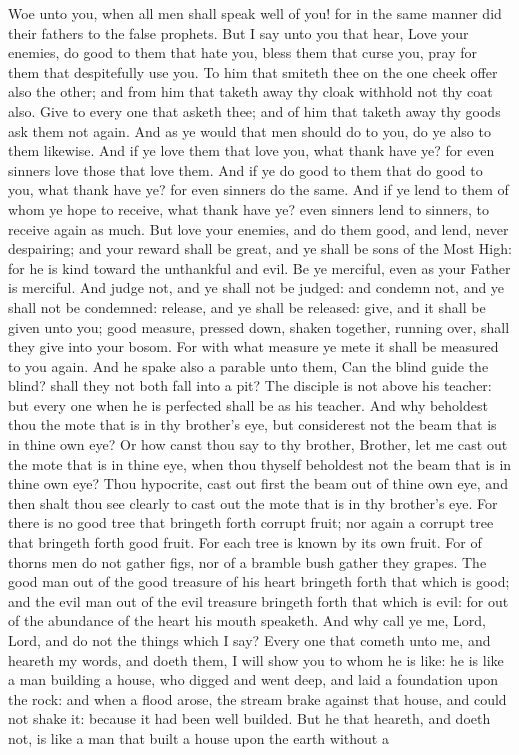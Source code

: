 Woe unto you, when all men shall speak well of you! for in the same manner did their fathers to the false prophets.  But I say unto you that hear, Love your enemies, do good to them that hate you, bless them that curse you, pray for them that despitefully use you. To him that smiteth thee on the one cheek offer also the other; and from him that taketh away thy cloak withhold not thy coat also. Give to every one that asketh thee; and of him that taketh away thy goods ask them not again. And as ye would that men should do to you, do ye also to them likewise. And if ye love them that love you, what thank have ye? for even sinners love those that love them. And if ye do good to them that do good to you, what thank have ye? for even sinners do the same. And if ye lend to them of whom ye hope to receive, what thank have ye? even sinners lend to sinners, to receive again as much. But love your enemies, and do them good, and lend, never despairing; and your reward shall be great, and ye shall be sons of the Most High: for he is kind toward the unthankful and evil. Be ye merciful, even as your Father is merciful. And judge not, and ye shall not be judged: and condemn not, and ye shall not be condemned: release, and ye shall be released: give, and it shall be given unto you; good measure, pressed down, shaken together, running over, shall they give into your bosom. For with what measure ye mete it shall be measured to you again.  And he spake also a parable unto them, Can the blind guide the blind? shall they not both fall into a pit? The disciple is not above his teacher: but every one when he is perfected shall be as his teacher. And why beholdest thou the mote that is in thy brother’s eye, but considerest not the beam that is in thine own eye? Or how canst thou say to thy brother, Brother, let me cast out the mote that is in thine eye, when thou thyself beholdest not the beam that is in thine own eye? Thou hypocrite, cast out first the beam out of thine own eye, and then shalt thou see clearly to cast out the mote that is in thy brother’s eye. For there is no good tree that bringeth forth corrupt fruit; nor again a corrupt tree that bringeth forth good fruit. For each tree is known by its own fruit. For of thorns men do not gather figs, nor of a bramble bush gather they grapes. The good man out of the good treasure of his heart bringeth forth that which is good; and the evil man out of the evil treasure bringeth forth that which is evil: for out of the abundance of the heart his mouth speaketh.  And why call ye me, Lord, Lord, and do not the things which I say? Every one that cometh unto me, and heareth my words, and doeth them, I will show you to whom he is like: he is like a man building a house, who digged and went deep, and laid a foundation upon the rock: and when a flood arose, the stream brake against that house, and could not shake it: because it had been well builded. But he that heareth, and doeth not, is like a man that built a house upon the earth without a 